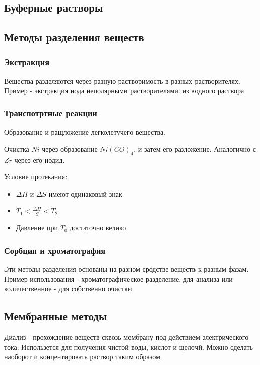 \documentclass[11pt]{article}
\begin{document}
\subsection{Буферные растворы}


\subsection{Методы разделения веществ}

\subsubsection{Экстракция}

Вещества разделяются через разную растворимость в разных растворителях. Пример - экстракция иода неполярными растворителями. из водного раствора

\subsubsection{Транспотртные реакции}
Образование и ращложение легколетучего вещества.

Очистка $Ni$ через образование $Ni(CO)_4$, и затем его разложение. Аналогично с $Zr$ через его иодид.

Условие протекания:
\begin{itemize}
\item $\Delta H$ и $\Delta S$ имеют одинаковый знак
\item $T_1<\frac{\Delta H}{S}<T_2$
\item Давление при $T_0$ достаточно велико
\end{itemize}

\subsubsection{Сорбция и хроматография}

Эти методы разделения основаны на разном сродстве веществ к разным фазам. Пример использования - хроматографическое разделение, для анализа или количественное - для собственно очистки.

\subsection{Мембранные методы}

Диализ - прохождение веществ сквозь мембрану под действием электрического тока. Использется для получения чистой воды, кислот и щелочй. Можно сделать наоборот и концентировать раствор таким образом.
\end{document}
